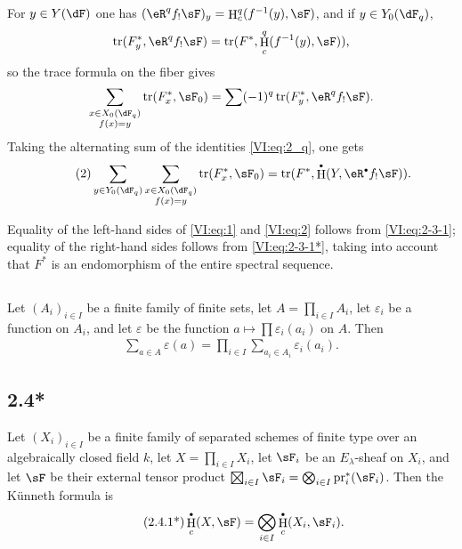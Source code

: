 \documentclass[12pt,oneside,english]{smfbook}
\DeclareMathOperator{\h}{H}
\DeclareMathOperator{\tr}{tr}
\newcommand{\pr}{\mathrm{pr}} %
\newcommand{\bigboxtimes}{\mathop{\vphantom{\sum}\mathchoice
  {\vcenter{\hbox{\huge $\boxtimes$}}}
  {\vcenter{\hbox{\Large $\boxtimes$}}}{\boxtimes}{\boxtimes}}\displaylimits}
\let\oldbullet\bullet
\renewcommand{\bullet}{\textnormal{\tiny$\oldbullet$}}
\begin{document}
For $y\in Y(\dF)$ one has $(\eR^qf_!\sF)_y=\h_c^q(f^{-1}(y),\sF)$, and if $y\in Y_0(\dF_q)$,
\[
  \tr(F_y^\ast,\eR^q f_! \sF) = \tr(F^\ast,\h_c^q(f^{-1}(y),\sF)) \text{,}
\]
so the trace formula on the fiber gives
\[
  \sum_{\substack{x\in X_0(\dF_q) \\ f(x) = y}} \tr(F_x^\ast,\sF_0) = \sum (-1)^q \tr(F_y^\ast,\eR^q f_! \sF) \text{.}
\]
Taking the alternating sum of the identities \eqref{VI:eq:2_q}, one gets
\begin{align*}\tag{2}\label{VI:eq:2}
  \sum_{y\in Y_0(\dF_q)} \sum_{\substack{x \in X_0(\dF_q) \\ f(x) = y}} \tr(F_x^\ast,\sF_0) = \tr(F^\ast,\h^\bullet(Y,\eR^\bullet f_! \sF)) \text{.}
\end{align*}

Equality of the left-hand sides of \eqref{VI:eq:1} and \eqref{VI:eq:2} follows from \eqref{VI:eq:2-3-1}; equality of the right-hand sides follows from \eqref{VI:eq:2-3-1*}, taking into account that $F^\ast$ is an endomorphism of the entire spectral sequence.

\subsection{}\label{VI:2-4}

Let $(A_i)_{i\in I}$ be a finite family of finite sets, let $A=\prod_{i\in I}A_i$, let $\varepsilon_i$ be a function on $A_i$, and let $\varepsilon$ be the function $a\mapsto\prod\varepsilon_i(a_i)$ on $A$. Then
\begin{align*}\tag{2.4.1}\label{VI:eq:2-4-1}
  \sum_{a\in A} \varepsilon(a) = \prod_{i\in I} \sum_{a_i\in A_i} \varepsilon_i(a_i) \text{.}
\end{align*}

\subsection*{2.4*}\label{VI:2-4*}

Let $(X_i)_{i\in I}$ be a finite family of separated schemes of finite type over an algebraically closed field $k$, let $X=\prod_{i\in I}X_i$, let $\sF_i$ be an $E_\lambda$-sheaf on $X_i$, and let $\sF$ be their external tensor product $\bigboxtimes_{i\in I}\sF_i=\bigotimes_{i\in I}\pr_i^\ast(\sF_i)$. Then the K\"unneth formula is
\begin{align*}\tag{2.4.1*}\label{VI:eq:2-4-1*}
  \h_c^\bullet(X,\sF) = \bigotimes_{i\in I} \h_c^\bullet(X_i,\sF_i) \text{.}
\end{align*}
\end{document}
